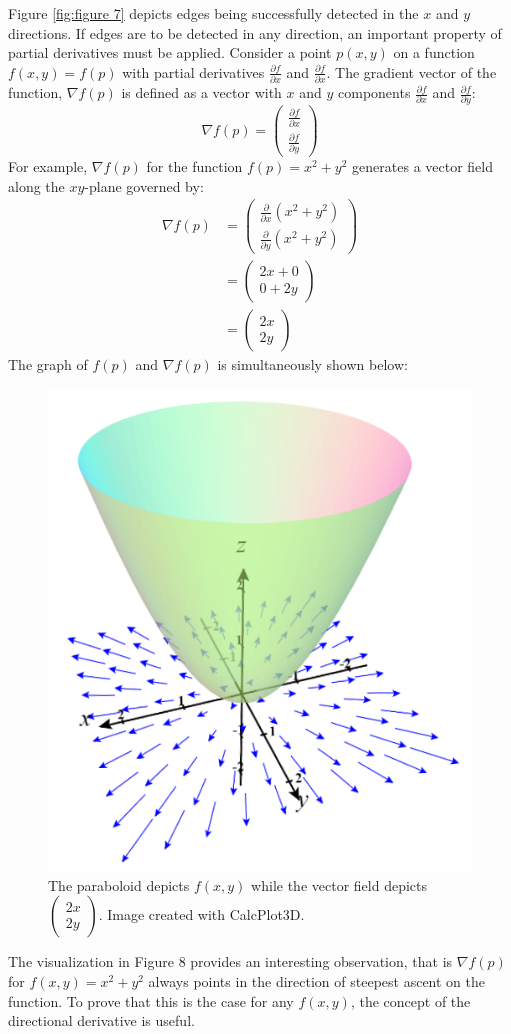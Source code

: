 \documentclass{article}
\begin{document}
Figure \ref{fig:figure 7} depicts edges being successfully detected in the $x$ and $y$ directions. If edges are to be detected in any direction, an important property of partial derivatives must be applied. Consider a point $p(x,y)$ on a function $f(x,y)=f(p)$ with partial derivatives $\frac{\partial f}{\partial x}$ and $\frac{\partial f}{\partial x}$. The gradient vector of the function, $\nabla f(p)$ is defined as a vector with $x$ and $y$ components $\frac{\partial f}{\partial x}$ and $\frac{\partial f}{\partial y}$:
\begin{equation}
    \nabla f(p) = \begin{pmatrix}
        \frac{\partial f}{\partial x} \\[1ex]
        \frac{\partial f}{\partial y}
    \end{pmatrix}
\end{equation}
For example, $\nabla f(p)$ for the function $f(p) = x^2 + y^2$ generates a vector field along the $xy$-plane governed by:
\begin{align}
    \nabla f(p) &= \begin{pmatrix}
        \frac{\partial}{\partial x} (x^2 + y^2) \\[1ex]
        \frac{\partial}{\partial y} (x^2 + y^2)
    \end{pmatrix} \nonumber \\
    &= \begin{pmatrix}
        2x + 0 \\
        0 + 2y
    \end{pmatrix} \nonumber \\
    &= \begin{pmatrix}
        2x \\
        2y
    \end{pmatrix}
\end{align}
The graph of $f(p)$ and $\nabla f(p)$ is simultaneously shown below:

\begin{figure}[!hbtp]
    \centering
    \includegraphics[width=0.5\linewidth]{figures/figure08.png}
    \caption{The paraboloid depicts $f(x,y)$ while the vector field depicts $\begin{pmatrix}2x\\2y\end{pmatrix}$. Image created with CalcPlot3D.}
    \label{figure 8}
\end{figure}

The visualization in Figure 8 provides an interesting observation, that is $\nabla f(p)$ for $f(x,y)=x^2+y^2$ always points in the direction of steepest ascent on the function. To prove that this is the case for any $f(x,y)$, the concept of the directional derivative is useful.
\end{document}

